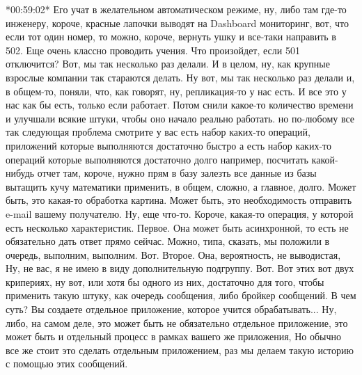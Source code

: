 \documentclass[12pt]{article} %
\begin{document}
*00:59:02*
Его учат в желательном автоматическом режиме,  ну, либо там где-то инженеру, короче, красные лапочки выводят на Dashboard мониторинг, вот, что если тот один номер, то можно, короче, вернуть ушку и все-таки направить в 502.  Еще очень классно проводить учения.  Что произойдет, если 501 отключится?  Вот, мы так несколько раз делали.  И в целом, ну, как крупные взрослые компании так стараются делать.  Ну вот, мы так несколько раз делали и, в общем-то, поняли, что, как говорят, ну, репликация-то у нас есть.  И все это у нас как бы есть, только если работает.  Потом снили какое-то количество времени и улучшали всякие штуки, чтобы оно начало реально работать.  но по-любому все так следующая проблема смотрите у вас есть набор каких-то операций, приложений которые выполняются достаточно быстро а есть набор каких-то операций которые выполняются достаточно долго например, посчитать какой-нибудь отчет там, короче, нужно прям в базу залезть все данные из базы вытащить кучу математики применить, в общем, сложно, а главное, долго.  Может быть, это какая-то обработка картина.  Может быть, это необходимость отправить e-mail вашему получателю.  Ну, еще что-то. Короче, какая-то операция, у которой есть несколько характеристик.  Первое. Она может быть асинхронной, то есть не обязательно дать ответ прямо сейчас.  Можно, типа, сказать, мы положили в очередь, выполним, выполним. Вот.  Второе. Она, вероятность, не выводистая, Ну, не вас, я не имею в виду дополнительную подгруппу.  Вот.  Вот этих вот двух крипериях, ну вот, или хотя бы одного из них, достаточно для того, чтобы применить такую штуку, как очередь сообщения, либо бройкер сообщений.  В чем суть?  Вы создаете отдельное приложение, которое учится обрабатывать...  Ну, либо, на самом деле, это может быть не обязательно отдельное приложение, это может быть и отдельный процесс в рамках вашего же приложения, Но обычно все же стоит это сделать отдельным приложением, раз мы делаем такую историю с помощью этих сообщений.
\end{document}
